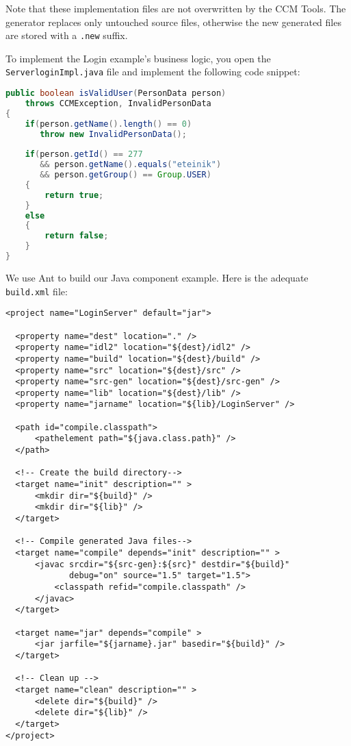 \vspace{3mm}
Note that these implementation files are not overwritten by the CCM Tools.
The generator replaces only untouched source files, otherwise the new
generated files are stored with a {\tt .new} suffix.

 \vspace{3mm}
To implement the Login example's business logic, you open the 
{\tt ServerloginImpl.java} file and implement the following code snippet:

\begin{footnotesize}
\begin{lstlisting}[language=Java]
public boolean isValidUser(PersonData person)
    throws CCMException, InvalidPersonData
{
    if(person.getName().length() == 0)
       throw new InvalidPersonData();
        
    if(person.getId() == 277
       && person.getName().equals("eteinik")
       && person.getGroup() == Group.USER)
    {
        return true;
    }
    else
    {
        return false;
    }
}    
\end{lstlisting}
\end{footnotesize}

We use Ant to build our Java component example. Here is the adequate
{\tt build.xml} file:
\begin{footnotesize}
\begin{verbatim}
<project name="LoginServer" default="jar">

  <property name="dest" location="." />
  <property name="idl2" location="${dest}/idl2" />
  <property name="build" location="${dest}/build" />
  <property name="src" location="${dest}/src" />
  <property name="src-gen" location="${dest}/src-gen" />
  <property name="lib" location="${dest}/lib" />
  <property name="jarname" location="${lib}/LoginServer" />

  <path id="compile.classpath">
      <pathelement path="${java.class.path}" />
  </path>

  <!-- Create the build directory-->
  <target name="init" description="" >
      <mkdir dir="${build}" />
      <mkdir dir="${lib}" />
  </target>
 
  <!-- Compile generated Java files-->
  <target name="compile" depends="init" description="" >
      <javac srcdir="${src-gen}:${src}" destdir="${build}" 
             debug="on" source="1.5" target="1.5">
          <classpath refid="compile.classpath" />  
      </javac>
  </target>

  <target name="jar" depends="compile" >
      <jar jarfile="${jarname}.jar" basedir="${build}" />
  </target>    

  <!-- Clean up -->
  <target name="clean" description="" >
      <delete dir="${build}" />
      <delete dir="${lib}" />
  </target>
</project>
\end{verbatim}
\end{footnotesize}

